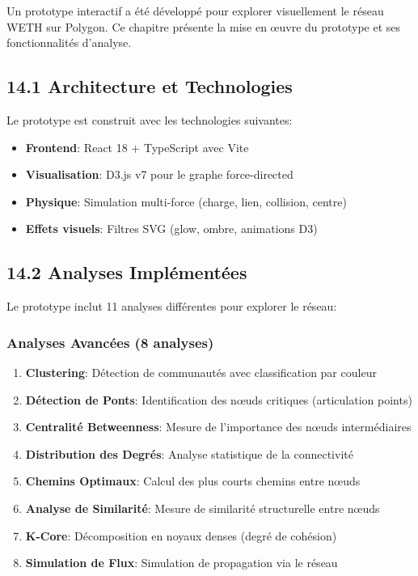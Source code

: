 \documentclass[12pt,a4paper]{article}
\begin{document}
Un prototype interactif a été développé pour explorer visuellement le réseau WETH sur Polygon.
Ce chapitre présente la mise en œuvre du prototype et ses fonctionnalités d'analyse.

\subsection*{14.1 Architecture et Technologies}

Le prototype est construit avec les technologies suivantes:
\begin{itemize}
  \item \textbf{Frontend}: React 18 + TypeScript avec Vite
  \item \textbf{Visualisation}: D3.js v7 pour le graphe force-directed
  \item \textbf{Physique}: Simulation multi-force (charge, lien, collision, centre)
  \item \textbf{Effets visuels}: Filtres SVG (glow, ombre, animations D3)
\end{itemize}

\subsection*{14.2 Analyses Implémentées}

Le prototype inclut 11 analyses différentes pour explorer le réseau:

\subsubsection*{Analyses Avancées (8 analyses)}
\begin{enumerate}
  \item \textbf{Clustering}: Détection de communautés avec classification par couleur
  \item \textbf{Détection de Ponts}: Identification des nœuds critiques (articulation points)
  \item \textbf{Centralité Betweenness}: Mesure de l'importance des nœuds intermédiaires
  \item \textbf{Distribution des Degrés}: Analyse statistique de la connectivité
  \item \textbf{Chemins Optimaux}: Calcul des plus courts chemins entre nœuds
  \item \textbf{Analyse de Similarité}: Mesure de similarité structurelle entre nœuds
  \item \textbf{K-Core}: Décomposition en noyaux denses (degré de cohésion)
  \item \textbf{Simulation de Flux}: Simulation de propagation via le réseau
\end{enumerate}
\end{document}
